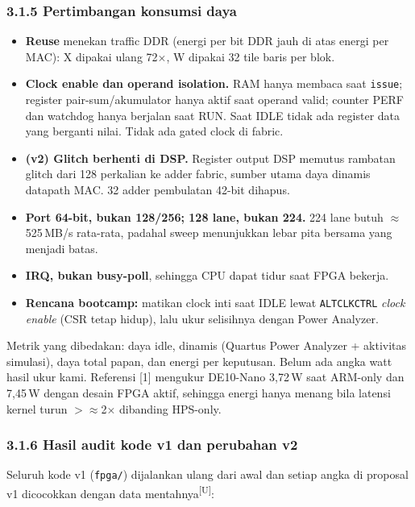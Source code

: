 \documentclass[10pt]{article}
\newcommand{\code}[1]{\texttt{\small #1}}
\newcommand{\U}{\textsuperscript{[U]}}
\begin{document}
\subsubsection{3.1.5 Pertimbangan konsumsi daya}
\begin{itemize}
\item \textbf{Reuse} menekan traffic DDR (energi per bit DDR jauh di atas energi per MAC): X dipakai ulang 72$\times$, W dipakai 32 tile baris per blok.
\item \textbf{Clock enable dan operand isolation.} RAM hanya membaca saat \code{issue}; register pair-sum/akumulator hanya aktif saat operand valid; counter PERF dan watchdog hanya berjalan saat RUN. Saat IDLE tidak ada register data yang berganti nilai. Tidak ada gated clock di fabric.
\item \textbf{(v2) Glitch berhenti di DSP.} Register output DSP memutus rambatan glitch dari 128 perkalian ke adder fabric, sumber utama daya dinamis datapath MAC. 32 adder pembulatan 42-bit dihapus.
\item \textbf{Port 64-bit, bukan 128/256; 128 lane, bukan 224.} 224 lane butuh $\approx$525\,MB/s rata-rata, padahal sweep menunjukkan lebar pita bersama yang menjadi batas.
\item \textbf{IRQ, bukan busy-poll}, sehingga CPU dapat tidur saat FPGA bekerja.
\item \textbf{Rencana bootcamp:} matikan clock inti saat IDLE lewat \code{ALTCLKCTRL} \emph{clock enable} (CSR tetap hidup), lalu ukur selisihnya dengan Power Analyzer.
\end{itemize}
Metrik yang dibedakan: daya idle, dinamis (Quartus Power Analyzer + aktivitas simulasi), daya total papan, dan energi per keputusan. Belum ada angka watt hasil ukur kami. Referensi [1] mengukur DE10-Nano 3,72\,W saat ARM-only dan 7,45\,W dengan desain FPGA aktif, sehingga energi hanya menang bila latensi kernel turun $>\approx$2$\times$ dibanding HPS-only.

\subsubsection{3.1.6 Hasil audit kode v1 dan perubahan v2}
Seluruh kode v1 (\texttt{fpga/}) dijalankan ulang dari awal dan setiap angka di proposal v1 dicocokkan dengan data mentahnya\U:
\end{document}
